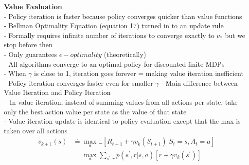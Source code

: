 \documentclass{article}
\begin{document}
\newpage
\noindent
\textbf{Value Evaluation}\\
- Policy iteration is faster because policy converges quicker
than value functions\\
- Bellman Optimality Equation (equation 17) turned in to an update rule \\
- Formally requires infinite number of iterations to converge exactly to $v_{*}$
but we stop before then \\
- Only guarantees $\epsilon - optimality$ (theoretically)\\
- All algorithms converge to an optimal policy for discounted finite MDPs\\
- When $\gamma$ is close to 1, iteration goes forever = making value iteration
inefficient\\
- Policy iteration converges faster even for smaller $\gamma$
- Main difference between Value Iteration and Policy Iteration\\
-- In value iteration, instead of summing values from all actions per state,
take only the best action value per state as the value of that state\\
- Value iteration update is identical to policy evaluation except that the max
is taken over all actions\\

\begin{equation}
\begin{aligned}
v_{k+1}(s) & \doteq \max _{a} \mathbb{E}\left[R_{t+1}+\gamma v_{k}\left(S_{t+1}\right) | S_{t}=s, A_{t}=a\right] \\
&=\max _{a} \sum_{s^{\prime}, r} p\left(s^{\prime}, r | s, a\right)\left[r+\gamma v_{k}\left(s^{\prime}\right)\right]
\end{aligned}
\end{equation}
\end{document}

